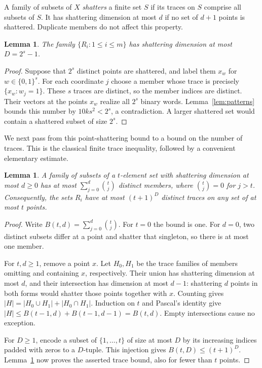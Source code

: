 \documentclass[11pt]{article}
\newtheorem{lemma}[theorem]{Lemma}
\begin{document}
A family of subsets of $X$ \emph{shatters} a finite set $S$ if its traces on $S$ comprise all subsets of $S$. It has shattering dimension at most $d$ if no set of $d+1$ points is shattered. Duplicate members do not affect this property.

\begin{lemma}\label{lem:dimension}
The family $\{R_i:1\le i\le m\}$ has shattering dimension at most $D=2^s-1$.
\end{lemma}
\begin{proof}
Suppose that $2^s$ distinct points are shattered, and label them $x_w$ for $w\in\{0,1\}^s$. For each coordinate $j$ choose a member whose trace is precisely $\{x_w:w_j=1\}$. These $s$ traces are distinct, so the member indices are distinct. Their vectors at the points $x_w$ realize all $2^s$ binary words. Lemma~\ref{lem:patterns} bounds this number by $10ks^2<2^s$, a contradiction. A larger shattered set would contain a shattered subset of size $2^s$.
\end{proof}

We next pass from this point-shattering bound to a bound on the number of traces. This is the classical finite trace inequality, followed by a convenient elementary estimate.

\begin{lemma}\label{lem:sauer}
A family of subsets of a $t$-element set with shattering dimension at most $d\ge0$ has at most $\sum_{j=0}^d\binom tj$ distinct members, where $\binom tj=0$ for $j>t$. Consequently, the sets $R_i$ have at most $(t+1)^D$ distinct traces on any set of at most $t$ points.
\end{lemma}
\begin{proof}
Write $B(t,d)=\sum_{j=0}^d\binom tj$. For $t=0$ the bound is one. For $d=0$, two distinct subsets differ at a point and shatter that singleton, so there is at most one member.

For $t,d\ge1$, remove a point $x$. Let $H_0,H_1$ be the trace families of members omitting and containing $x$, respectively. Their union has shattering dimension at most $d$, and their intersection has dimension at most $d-1$: shattering $d$ points in both forms would shatter those points together with $x$. Counting gives $|H|=|H_0\cup H_1|+|H_0\cap H_1|$. Induction on $t$ and Pascal's identity give $|H|\le B(t-1,d)+B(t-1,d-1)=B(t,d)$. Empty intersections cause no exception.

For $D\ge1$, encode a subset of $\{1,\ldots,t\}$ of size at most $D$ by its increasing indices padded with zeros to a $D$-tuple. This injection gives $B(t,D)\le(t+1)^D$. Lemma~\ref{lem:dimension} now proves the asserted trace bound, also for fewer than $t$ points.
\end{proof}
\end{document}
